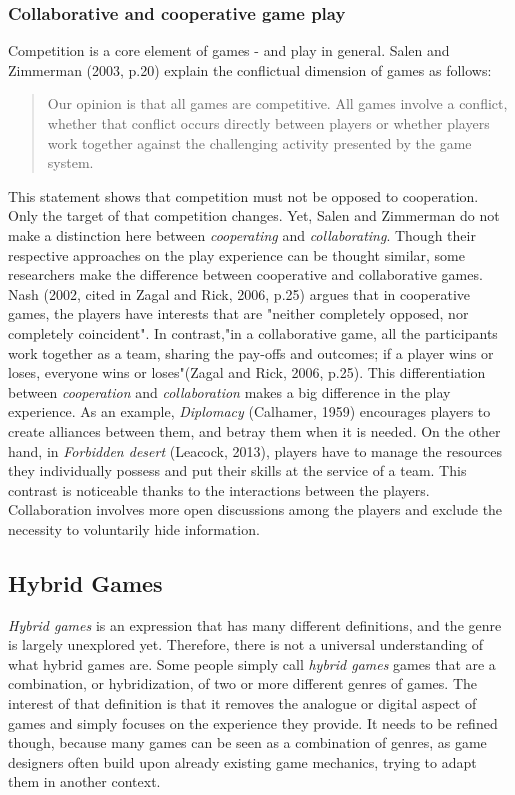 \subsubsection{Collaborative and cooperative game play}
Competition is a core element of games - and play in general. Salen and Zimmerman (2003, p.20) explain the conflictual dimension of games as follows:
\begin{quotation}
Our opinion is that all games are competitive. All games involve a conflict, whether that conflict occurs directly between players or whether players work together against the challenging activity presented by the game system.
\end{quotation}
This statement shows that competition must not be opposed to cooperation. Only the target of that competition changes. Yet, Salen and Zimmerman do not make a distinction here between \textit{cooperating} and \textit{collaborating}. Though their respective approaches on the play experience can be thought similar, some researchers make the difference between cooperative and collaborative games. Nash (2002, cited in Zagal and Rick, 2006, p.25)\cite{art:collab} argues that in cooperative games, the players have interests that are "neither completely opposed, nor completely coincident". In contrast,"in a collaborative game, all the participants work together as a team, sharing the pay-offs and outcomes; if a player wins or loses, everyone wins or loses"(Zagal and Rick, 2006, p.25). This differentiation between \textit{cooperation} and \textit{collaboration} makes a big difference in the play experience. As an example, \textit{Diplomacy} (Calhamer, 1959)\cite{game:diplo} encourages players to create alliances between them, and betray them when it is needed. On the other hand, in \textit{Forbidden desert} (Leacock, 2013)\cite{game:desert}, players have to manage the resources they individually possess and put their skills at the service of a team. 
This contrast is noticeable thanks to the interactions between the players. Collaboration involves more open discussions among the players and exclude the necessity to voluntarily hide information.

\subsection{Hybrid Games}
\textit{Hybrid games} is an expression that has many different definitions, and the genre is largely unexplored yet. Therefore, there is not a universal understanding of what hybrid games are. Some people simply call \textit{hybrid games} games that are a combination, or hybridization, of two or more different genres of games. The interest of that definition is that it removes the analogue or digital aspect of games and simply focuses on the experience they provide. It needs to be refined though, because many games can be seen as a combination of genres, as game designers often build upon already existing game mechanics, trying to adapt them in another context. 

